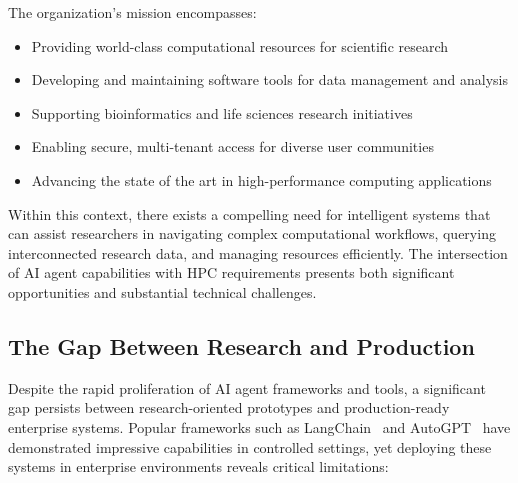 The organization's mission encompasses:

\begin{itemize}
    \item Providing world-class computational resources for scientific research
    \item Developing and maintaining software tools for data management and analysis
    \item Supporting bioinformatics and life sciences research initiatives
    \item Enabling secure, multi-tenant access for diverse user communities
    \item Advancing the state of the art in high-performance computing applications
\end{itemize}

Within this context, there exists a compelling need for intelligent systems that can assist researchers in navigating complex computational workflows, querying interconnected research data, and managing resources efficiently. The intersection of AI agent capabilities with HPC requirements presents both significant opportunities and substantial technical challenges.

\subsection{The Gap Between Research and Production}

Despite the rapid proliferation of AI agent frameworks and tools, a significant gap persists between research-oriented prototypes and production-ready enterprise systems. Popular frameworks such as LangChain~\cite{langchain2023} and AutoGPT~\cite{significant2023autogpt} have demonstrated impressive capabilities in controlled settings, yet deploying these systems in enterprise environments reveals critical limitations:

